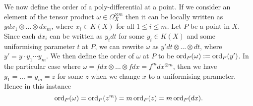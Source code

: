 We now define the order of a poly-differential at a point.
If we consider an element of the tensor product $\omega \in \Omega_X^{\otimes m}$ then it can be locally written as $y dx_1\otimes \ldots \otimes dx_m$, where $x_i \in K(X)$ for all $1 \leq i \leq m$.
Let $P$ be a point in $X$.
Since each $dx_i$ can be written as $y_i dt$ for some $y_i\in K(X)$ and some uniformising parameter $t$ at $P$, we can rewrite $\omega$ as $y' dt \otimes \ldots \otimes dt$, where $y' = y \cdot y_1 \cdots y_m$.
We then define the order of $\omega$ at $P$ to be $\operatorname{ord}_P(\omega ) := \operatorname{ord}_P(y')$.
In the particular case where $\omega = fdx \otimes \ldots \otimes fdx = f^m dx^{\otimes m}$, then we have $y_1 = \ldots = y_m = z$ for some $z$ when we change $x$ to a uniformising parameter.
Hence in this instance \[ \operatorname{ord}_P(\omega) = \operatorname{ord}_P(z^m) = m\operatorname{ord}_P(z) = m\operatorname{ord}_P(dx).\]
